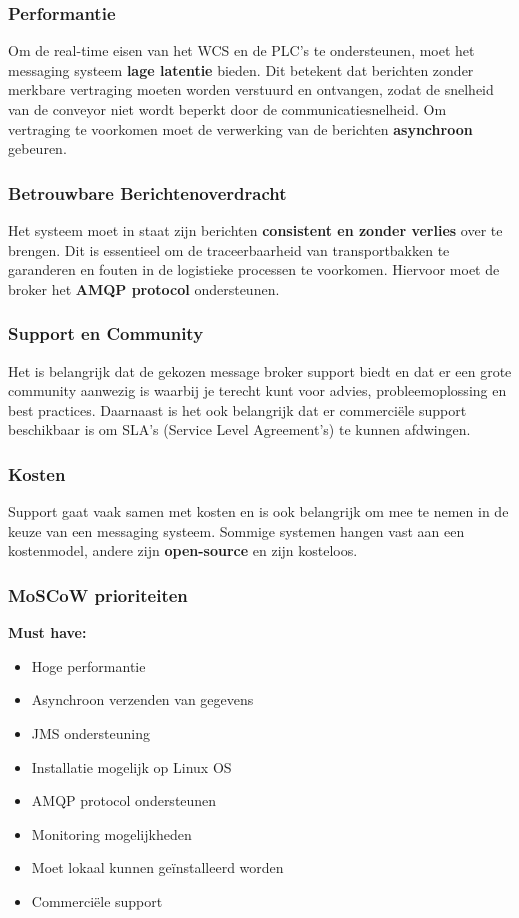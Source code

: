 \subsubsection{Performantie}
Om de real-time eisen van het WCS en de PLC’s te ondersteunen, moet het messaging systeem \textbf{lage latentie} bieden. 
Dit betekent dat berichten zonder merkbare vertraging moeten worden verstuurd en ontvangen, 
zodat de snelheid van de conveyor niet wordt beperkt door de communicatiesnelheid.
Om vertraging te voorkomen moet de verwerking van de berichten \textbf{asynchroon} gebeuren.

\subsubsection{Betrouwbare Berichtenoverdracht}
Het systeem moet in staat zijn berichten \textbf{consistent en zonder verlies} over te brengen. 
Dit is essentieel om de traceerbaarheid van transportbakken te garanderen en fouten in de logistieke processen te voorkomen.
Hiervoor moet de broker het \textbf{AMQP protocol} ondersteunen.

\subsubsection{Support en Community}
Het is belangrijk dat de gekozen message broker support biedt en dat er een grote community aanwezig is 
waarbij je terecht kunt voor advies, probleemoplossing en best practices.
Daarnaast is het ook belangrijk dat er commerciële support beschikbaar is om SLA's (Service Level Agreement's) te kunnen afdwingen.

\subsubsection{Kosten}
Support gaat vaak samen met kosten en is ook belangrijk om mee te nemen in de keuze van een messaging systeem.
Sommige systemen hangen vast aan een kostenmodel, andere zijn \textbf{open-source} en zijn kosteloos.

\subsubsection{MoSCoW prioriteiten}

\textbf{Must have:}
\begin{itemize}
\item Hoge performantie 
\item Asynchroon verzenden van gegevens  
\item JMS ondersteuning
\item Installatie mogelijk op Linux OS 
\item AMQP protocol ondersteunen 
\item Monitoring mogelijkheden
\item Moet lokaal kunnen geïnstalleerd worden
\item Commerciële support
\end{itemize}

